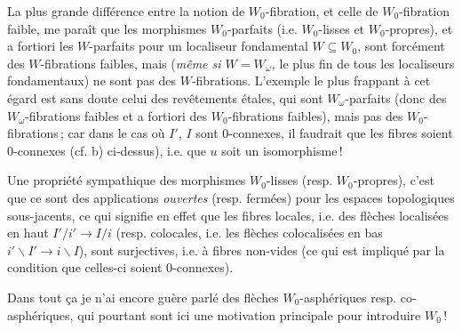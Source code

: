 \documentclass[11pt]{article}
\newcommand{\printedpage}[1]{\marginpar{\footnotesize p.~#1}}
\newcommand{\msp}[1]{\marginpar{\footnotesize [#1]}}
\begin{document}
La plus grande différence entre la notion de $W_0$-fibration, et celle de $W_0$-fibration faible, me paraît que les morphismes $W_0$-parfaits (i.e. $W_0$-lisses et $W_0$-propres), et a fortiori les $W$-parfaits pour un localiseur fondamental $W \subseteq W_0$, sont forcément des $W$-fibrations faibles, mais (\textit{même si $W = W_\omega$,} le plus fin de tous les localiseurs fondamentaux) ne sont pas des $W$-fibrations. L'exemple le plus frappant à cet égard est sans doute celui des revêtements étales, qui sont $W_\omega$-parfaits (donc
\msp{page 43}
des $W_\omega$-fibrations faibles et a fortiori des $W_0$-fibrations faibles), mais pas des $W_0$-fibrations\,; car dans le cas où $I'$, $I$ sont 0-connexes, il faudrait que les fibres soient 0-connexes (cf. b) ci-dessus), i.e. que $u$ soit un isomorphisme\,!

Une propriété sympathique des morphismes $W_0$-lisses (resp. $W_0$-propres), c'est que ce sont des applications \textit{ouvertes} (resp. fermées) pour les espaces topologiques sous-jacents, ce qui signifie en effet que les fibres locales, i.e. des flèches localisées en haut $I'/i' \longrightarrow I/i$ (resp. colocales, i.e. les flèches colocalisées en bas $i'\backslash I' \longrightarrow i\backslash I$), sont surjectives, i.e. à fibres non-vides (ce qui est impliqué par la condition que celles-ci soient 0-connexes).

\printedpage{28}
Dans tout ça je n'ai encore guère parlé des flèches $W_0$-asphériques resp. co-asphériques, qui pourtant sont ici une motivation principale pour introduire $W_0$\,!
\end{document}
